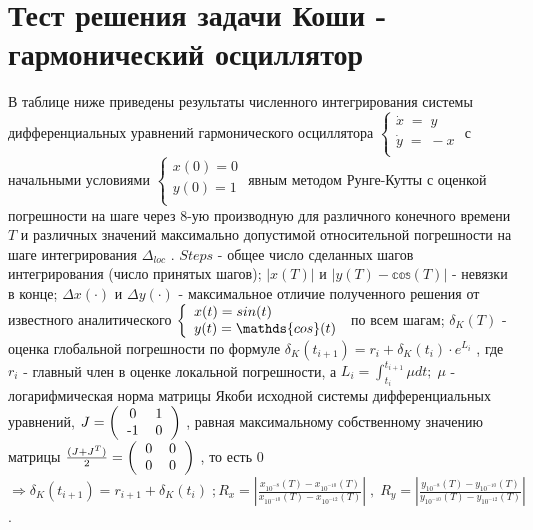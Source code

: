 \documentclass[a4paper,12pt]{article}
\begin{document}
\newpage

\section{Тест  решения задачи Коши - гармонический осциллятор}

В таблице ниже приведены результаты численного интегрирования системы дифференциальных уравнений гармонического осциллятора $
\left\{
\begin{array}{l}
    \dot x\;=\; y\\
    \dot y\;=\; -x\\
\end{array}
\right.
$  с начальными условиями  $
\left\{
\begin{array}{l}
    x(0)=0\\
    y(0)=1\\
\end{array}
\right.
$ явным методом Рунге-Кутты с оценкой погрешности на шаге через 8-ую производную для различного конечного времени $T$ и различных значений максимально допустимой относительной погрешности на шаге интегрирования $\Delta_{loc}$ . $Steps$ - общее число сделанных шагов интегрирования (число принятых шагов); $|x(T)|$ и $|y(T)-\mathds{cos}(T)|$ - невязки в конце;  $\Delta x(\cdot)$ и $\Delta y(\cdot)$ - максимальное отличие полученного решения от известного аналитического $
\left\{
\begin{array}{l}
    x(t)=\mathnormal{sin}(t)\\
    y(t)=\mathds{cos}(t)
\end{array}
\right.
$  по всем шагам;  $\delta_K(T)$ - оценка глобальной погрешности по формуле $\delta_K(t_{i+1})=r_i+\delta_K(t_i)\cdot e^{L_i}$ , где $r_i$ -  главный член в оценке локальной погрешности, а $L_i=\int_{t_i}^{t_{i+1}} \mu dt; \;\mu $ - логарифмическая норма матрицы Якоби исходной системы дифференциальных уравнений, $
J=
\left(
\begin{tabular}{cc}
    0&1\\
    -1&0\\
\end{tabular}
\right)
$ , равная максимальному собственному  значению матрицы $\frac{(J+J^T)}{2}=
\left(
\begin{tabular}{cc}
    0&0\\
    0&0\\
\end{tabular}
\right)
$ , то есть 0 $\Rightarrow \delta_K(t_{i+1})= r_{i+1} +\delta_K(t_i)\; ;
R_x = \left|\frac{x_{10^{-8}}(T)-x_{10^{-10}}(T)}{x_{10^{-10}}(T)-x_{10^{-12}}(T)}\right| \; , \; R_y= \left|\frac{y_{10^{-8}}(T)-y_{10^{-10}}(T)}{y_{10^{-10}}(T)-y_{10^{-12}}(T)}\right|$ .
 
\end{document}
